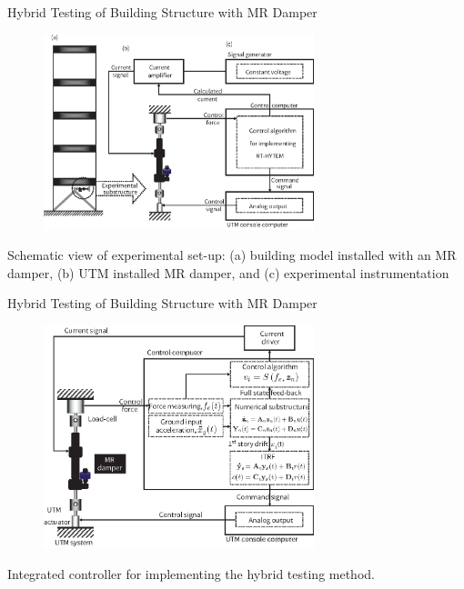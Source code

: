\documentclass[usepdftitle=false]{beamer}
\begin{document}
\begin{frame}{Hybrid Testing of Building Structure with MR Damper}
\begin{figure}[ht]
\centering
\includegraphics[width=0.7\textwidth] {figure/8-3.eps}
\label{fig:8-3}
\end{figure}
Schematic view of experimental set-up: (a) building model installed with an MR damper, (b) UTM installed MR damper, and (c) experimental instrumentation
\end{frame}

\begin{frame}{Hybrid Testing of Building Structure with MR Damper}
\begin{figure}[H]
\centering
\includegraphics[width=0.7\textwidth] {figure/8-7.eps}
\label{fig:8-7}
\end{figure}
Integrated controller for implementing the hybrid testing method.
\end{frame}
\end{document}
